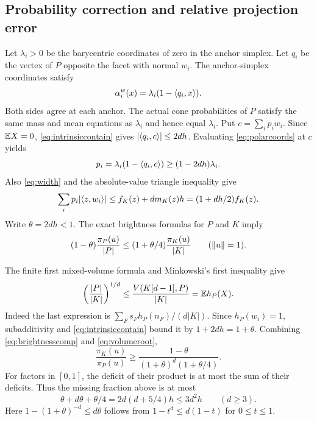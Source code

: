 \subsection{Probability correction and relative projection error}
Let $\lambda_i>0$ be the barycentric coordinates of zero in the anchor
simplex. Let $q_i$ be the vertex of $P$ opposite the facet with normal $w_i$.
The anchor-simplex coordinates satisfy
\begin{equation}\label{eq:polarcoords}
 \alpha_i^w(x)=\lambda_i(1-\langle q_i,x\rangle).
\end{equation}
Both sides agree at each anchor. The actual cone probabilities of $P$
satisfy the same mass and mean equations as $\lambda_i$ and hence equal
$\lambda_i$. Put $c=\sum_i p_iw_i$. Since $\mathbb E X=0$,
\eqref{eq:intrinsiccontain} gives $|\langle q_i,c\rangle|\le2dh$. Evaluating
\eqref{eq:polarcoords} at $c$ yields
\[
 p_i=\lambda_i(1-\langle q_i,c\rangle)\ge(1-2dh)\lambda_i.
\]
Also \eqref{eq:width} and the absolute-value triangle inequality give
\[
 \sum_i p_i|\langle z,w_i\rangle|\le f_K(z)+d m_K(z)h
 =(1+dh/2)f_K(z).
\]
Write $\theta=2dh<1$. The exact brightness formulas for $P$ and $K$ imply
\begin{equation}\label{eq:brightnesscomp}
 (1-\theta)\frac{\pi_P(u)}{|P|}
 \le(1+\theta/4)\frac{\pi_K(u)}{|K|}\qquad(\lVert u\rVert=1).
\end{equation}

The finite first mixed-volume formula and Minkowski's first inequality give
\begin{equation}\label{eq:volumeroot}
 \left(\frac{|P|}{|K|}\right)^{1/d}
 \le\frac{V(K[d-1],P)}{|K|}
 =\mathbb E h_P(X).
\end{equation}
Indeed the last expression is
$\sum_Fs_Fh_P(n_F)/(d|K|)$. Since $h_P(w_i)=1$, subadditivity and
\eqref{eq:intrinsiccontain} bound it by $1+2dh=1+\theta$.
Combining \eqref{eq:brightnesscomp} and \eqref{eq:volumeroot},
\[
 \frac{\pi_K(u)}{\pi_P(u)}
 \ge\frac{1-\theta}{(1+\theta)^d(1+\theta/4)}.
\]
For factors in $[0,1]$, the deficit of their product is at most the sum of
their deficits. Thus the missing fraction above is at most
\begin{equation}\label{eq:scalar}
 \theta+d\theta+\theta/4
 =2d(d+5/4)h\le3d^2h\qquad(d\ge3).
\end{equation}
Here $1-(1+\theta)^{-d}\le d\theta$ follows from
$1-t^d\le d(1-t)$ for $0\le t\le1$.

